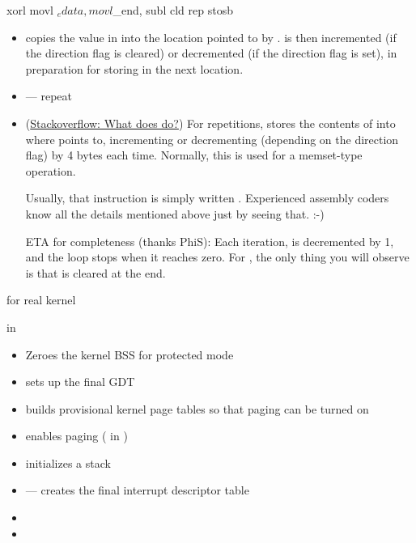 \begin{itemize}
  \begin{varwidth}{.2\textwidth}
    \begin{gascode}
xorl %
movl $_edata,%
movl $_end,%
subl %
cld
rep
stosb
    \end{gascode}
  \end{varwidth}
  \begin{itemize}
  \item \href{http://www.cs.ubbcluj.ro/~dadi/ac/doc/ng1d5fc.html}{} copies the
    value in  into the location pointed to by .  is then
    incremented (if the direction flag is cleared) or decremented (if the direction flag
    is set), in preparation for storing  in the next location.
  \item {} --- repeat
  \item
    (\href{http://stackoverflow.com/questions/3818856/what-does-this-assembly-do}{Stackoverflow:
      What does  do?}) For  repetitions, stores the contents of
     into where  points to, incrementing or decrementing 
    (depending on the direction flag) by 4 bytes each time. Normally, this is used for a
    memset-type operation.

    Usually, that instruction is simply written . Experienced assembly
    coders know all the details mentioned above just by seeing that. :-)

    ETA for completeness (thanks PhiS): Each iteration,  is decremented by 1,
    and the loop stops when it reaches zero. For , the only thing you will
    observe is that  is cleared at the end.
  \end{itemize}
\end{itemize}

\begin{frame}{ for real kernel}
  \begin{block}{ in }
    \begin{itemize}
    \item Zeroes the kernel BSS for protected mode
    \item sets up the final GDT
    \item builds provisional kernel page tables so that paging can be turned on
    \item enables paging ( in )
    \item initializes a stack
    \item {} --- creates the final interrupt descriptor table
    \item {}
    \item {}
    \end{itemize}
  \end{block}
\end{frame}

